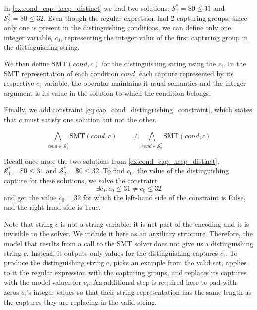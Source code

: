 \begin{example}
In \autoref{ex:cond_cap_keep_distinct} we had two solutions: \(\mathcal{S}_1^* = \$0 \le 31\) and \(\mathcal{S}_2^* = \$0 \le 32\). Even though the regular expression had 2 capturing groups, since only one is present in the distinguishing conditions, we can define only one integer variable, \(c_0\), representing the integer value of the first capturing group in the distinguishing string.
\end{example}

We then define \(\textrm{SMT}(\textit{cond}, c)\) for the distinguishing string using the \(c_i\). In the \ac{SMT} representation of each condition \(\textit{cond}\), each capture represented by its respective \(c_i\) variable, the operator maintains it usual semantics and the integer argument is its value in the solution to which the condition belongs.

Finally, we add constraint \eqref{eq:cap_cond_distinguishing_constraint}, which states that \(c\) must satisfy one solution but not the other.

\begin{equation}\label{eq:cap_cond_distinguishing_constraint}
    \bigwedge_{\textit{cond} \in \mathcal{S}_1^*} \textrm{SMT}(\textit{cond}, c) \qquad\ne \bigwedge_{\textit{cond} \in \mathcal{S}_2^*} \textrm{SMT}(\textit{cond}, c)
\end{equation}

\begin{example}
Recall once more the two solutions from \autoref{ex:cond_cap_keep_distinct}, \(\mathcal{S}_1^* = \$0 \le 31\) and \(\mathcal{S}_2^* = \$0 \le 32\). To find \(c_0\), the value of the distinguishing capture for these solutions, we solve the constraint
\begin{equation*}
    \exists c_0 : c_0 \le 31 \ne c_0 \le 32
\end{equation*}
and get the value \(c_0 = 32\) for which the left-hand side of the constraint is False, and the right-hand side is True.
\end{example}

Note that string \(c\) is not a string variable: it is not part of the encoding and it is invisible to the solver. We include it here as an auxiliary structure. Therefore, the model that results from a call to the \ac{SMT} solver does not give us a distinguishing string \(c\). Instead, it outputs only values for the distinguishing captures \(c_i\). To produce the distinguishing string c, \Forest picks an example from the valid set, applies to it the regular expression with the capturing groups, and replaces its captures with the model values for \(c_i\). An additional step is required here to pad with zeros \(c_i\)'s integer values so that their string representation has the same length as the captures they are replacing in the valid string.






